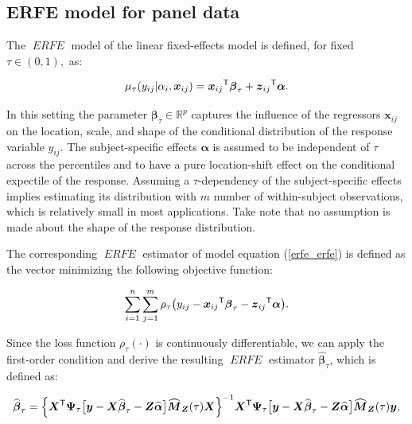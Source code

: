 \documentclass[15pt,a4paper]{article}
\newcommand{\transpose}{{}^{\text{\sffamily T}}}
\DeclareMathOperator{\ERFE}{\textit{ERFE}}
\begin{document}
\subsection{ERFE model for panel data}

The $\ERFE$ model of the linear fixed-effects model is defined, for fixed \(\tau \in (0,1),\) as:

\begin{equation}\label{erfe_erfe}
\mu_{\tau}(y_{ij}|\alpha_{i},\boldsymbol{x}_{ij})=\boldsymbol{x}_{ij}\transpose\boldsymbol{\beta}_{\tau} + \boldsymbol{z}_{ij}\transpose\boldsymbol{\alpha}.
\end{equation}


In this setting the parameter \(\boldsymbol{\beta}_{\tau} \in \mathbb{R}^p\) captures the influence of the regressors \(\boldsymbol{x}_{ij}\) on the location, scale, and shape of the conditional distribution of the response variable \(y_{ij}.\) The subject-specific effects \(\boldsymbol{\alpha}\) is assumed to be independent of \(\tau\) across the percentiles and to have a pure location-shift effect on the conditional expectile of the response. Assuming a \(\tau\)-dependency of the subject-specific effects implies estimating its distribution with \(m\) number of within-subject observations, which is relatively small in most applications. Take note that no assumption is made about the shape of the response distribution.

The corresponding $\ERFE$ estimator of model equation (\ref{erfe_erfe}) is defined as the vector minimizing the following objective function:

\begin{equation}\label{ObjFunSingFe_erfe}
  \sum_{i=1}^{n}\sum_{j=1}^{m} \rho_{\tau} \big( y_{ij}-\boldsymbol{x}_{ij}\transpose\boldsymbol{\beta}_{\tau} - \boldsymbol{z}_{ij}\transpose\boldsymbol{\alpha} \big).
\end{equation}

Since the loss function \(\rho_{\tau}(\cdot)\) is continuously differentiable, we can apply the first-order condition and derive the resulting $\ERFE$ estimator \(\widehat{\boldsymbol{\beta}}_{\tau}\), which is defined as:

\begin{equation}\label{withinerfebet_erfe}
  \widehat{\boldsymbol{\beta}}_{\tau} 
  = \Big\lbrace\boldsymbol{X}\transpose\boldsymbol{\Psi}_{\tau}\big[\boldsymbol{y}-\boldsymbol{X}\widehat{\boldsymbol{\beta}}_{\tau}- \boldsymbol{Z}\widehat{\boldsymbol{\alpha}}\big]\widehat{\boldsymbol{M}}_{\boldsymbol{Z}}(\tau)
  \boldsymbol{X}\Big\rbrace^{-1}\boldsymbol{X}\transpose\boldsymbol{\Psi}_{\tau}\big[\boldsymbol{y}-\boldsymbol{X}\widehat{\boldsymbol{\beta}}_{\tau}- \boldsymbol{Z}\widehat{\boldsymbol{\alpha}}\big]\widehat{\boldsymbol{M}}_{\boldsymbol{Z}}(\tau)\boldsymbol{y}, 
\end{equation}
\end{document}
